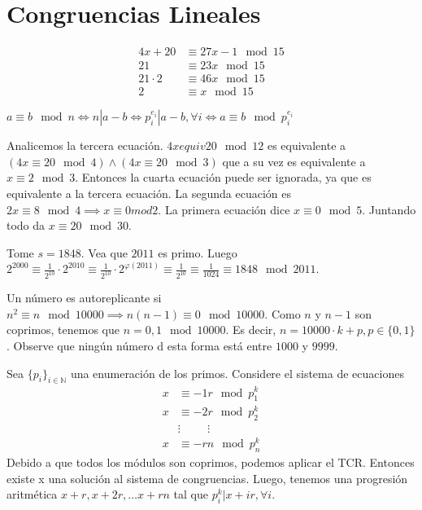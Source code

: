 \section{Congruencias Lineales}

\begin{sol}
	\begin{align}
	4x +20 &\equiv 27x -1 \mod 15 \\
	21 & \equiv 23x \mod 15 \\
	21 \cdot 2 &\equiv 46x \mod 15 \\
	2 &\equiv x \mod 15
	\end{align}
\end{sol}

\begin{sol}
	$ a \equiv b \mod n \iff  n|a-b \iff p_{i}^{e_{i}}|a-b, \forall i \iff a\equiv b \mod p_{i}^{e_{i}}$
 
\end{sol}

\begin{sol}
	Analicemos la tercera ecuaci\'on. $4x equiv 20 \mod 12$ es equivalente a $(4x \equiv 20 \mod 4) \land (4x \equiv 20 \mod 3)$ que a su vez es equivalente a $x \equiv 2 \mod 3$. Entonces la cuarta ecuaci\'on puede ser ignorada, ya que es equivalente a la tercera ecuaci\'on. La segunda ecuaci\'on es $2x \equiv 8 \mod 4 \implies x \equiv 0 mod 2$. La primera ecuaci\'on dice $x \equiv 0 \mod 5$. Juntando todo da $x \equiv 20 \mod 30$. 
\end{sol}

\begin{sol}
	Tome $s = 1848$.
	Vea que $2011 $ es primo. Luego $2^{2000} \equiv \frac{1}{2^{10}} \cdot 2^{2010} \equiv \frac{1}{2^{10}} \cdot 2^{\varphi(2011)} \equiv \frac{1}{2^{10}} \equiv \frac{1}{1024} \equiv 1848 \mod 2011$.
\end{sol}


\begin{sol}
	Un n\'umero es autoreplicante si $n^2 \equiv n \mod 10000\implies n(n-1) \equiv 0 \mod 10000$. Como $n $ y $n-1$ son coprimos, tenemos que $n = 0, 1 \mod 10000$. Es decir, $n = 10000\cdot k + p, p \in \{0, 1\}$. Observe que ning\'un n\'umero d esta forma est\'a entre $1000$ y $9999$. 
\end{sol}

\begin{sol}
	Sea $\{p_{i}\}_{i\in \mathbb{N}}$ una enumeraci\'on de los primos. Considere el sistema de ecuaciones
	\begin{align}
	x &\equiv -1r \mod p_{1}^k \\
	x&\equiv -2r \mod p_{2} ^k \\
	&\vdots \hspace{1cm} \vdots \\
	x &\equiv -rn \mod p_{n}^{k}   
	\end{align}
	Debido a que todos los m\'odulos son coprimos, podemos aplicar el TCR. Entonces existe x una soluci\'on al sistema de congruencias. Luego, tenemos una progresi\'on aritm\'etica $x+r, x+2r, \dots x+rn$ tal que $p_{i}^{k} | x+ir, \forall i$.
\end{sol}

